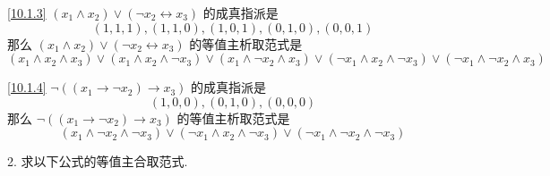 \documentclass[boxes]{homework}
\begin{document}
\begin{solution}
    \ref{10.1.3} $(x_1\land x_2)\lor (\lnot x_2\leftrightarrow x_3)$ 的成真指派是
    \begin{equation}
        (1,1,1), (1,1,0), (1,0,1), (0,1,0), (0,0,1)
    \end{equation}
    那么 $(x_1\land x_2)\lor (\lnot x_2\leftrightarrow x_3)$ 的等值主析取范式是
    \begin{equation}
        (x_1\land x_2\land x_3)\lor (x_1\land x_2\land\lnot x_3)\lor (x_1\land\lnot x_2\land x_3)\lor (\lnot x_1\land x_2\land\lnot x_3)\lor (\lnot x_1\land\lnot x_2\land x_3)
    \end{equation}

    \ref{10.1.4} $\lnot ((x_1\to\lnot x_2)\to x_3)$ 的成真指派是
    \begin{equation}
        (1,0,0), (0,1,0), (0,0,0)
    \end{equation}
    那么 $\lnot ((x_1\to\lnot x_2)\to x_3)$ 的等值主析取范式是
    \begin{equation}
        (x_1\land\lnot x_2\land\lnot x_3)\lor (\lnot x_1\land x_2\land\lnot x_3) \lor (\lnot x_1\land\lnot x_2\land\lnot x_3)
    \end{equation}
\end{solution}
\begin{problem}
2. 求以下公式的等值主合取范式.
\setcounter{enumi}{2}
\end{problem}
\end{document}
